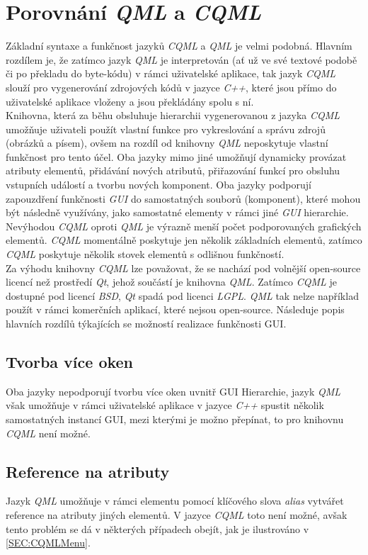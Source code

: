 \documentclass[11pt,twoside,a4paper]{book}
\begin{document}
\section{Porovnání \textit{QML} a \textit{CQML}}
Základní syntaxe a funkčnost jazyků \textit{CQML} a \textit{QML} je velmi podobná. Hlavním rozdílem je, že zatímco jazyk \textit{QML} je interpretován (ať už ve své textové podobě či po překladu do byte-kódu) v rámci uživatelské aplikace, tak jazyk \textit{CQML} slouží pro vygenerování zdrojových kódů v jazyce \textit{C++}, které jsou přímo do uživatelské aplikace vloženy a jsou překládány spolu s ní.\\
Knihovna, která za běhu obsluhuje hierarchii vygenerovanou z jazyka \textit{CQML} umožňuje uživateli použít vlastní funkce pro vykreslování a správu zdrojů (obrázků a písem), ovšem na rozdíl od knihovny \textit{QML} neposkytuje vlastní funkčnost pro tento účel.
Oba jazyky mimo jiné umožňují dynamicky provázat atributy elementů, přidávání nových atributů, přiřazování funkcí pro obsluhu vstupních událostí a tvorbu nových komponent. Oba jazyky podporují zapouzdření funkčnosti \textit{GUI} do samostatných souborů (komponent), které mohou být následně využívány, jako samostatné elementy v rámci jiné \textit{GUI} hierarchie.\\
Nevýhodou \textit{CQML} oproti \textit{QML} je výrazně menší počet podporovaných grafických elementů. \textit{CQML} momentálně poskytuje jen několik základních elementů, zatímco \textit{CQML} poskytuje několik stovek elementů s odlišnou funkčností.\\
Za výhodu knihovny \textit{CQML} lze považovat, že se nachází pod volnější open-source licencí než prostředí \textit{Qt}, jehož součástí je knihovna \textit{QML}. Zatímco \textit{CQML} je dostupné pod licencí \textit{BSD}, \textit{Qt} spadá pod licenci \textit{LGPL}. \textit{QML} tak nelze například použít v rámci komerčních aplikací, které nejsou open-source.
Následuje popis hlavních rozdílů týkajících se možností realizace funkčnosti GUI.
\subsection{Tvorba více oken}
Oba jazyky nepodporují tvorbu více oken uvnitř GUI Hierarchie, jazyk \textit{QML} však umožňuje v rámci uživatelské aplikace v jazyce \textit{C++} spustit několik samostatných instancí GUI, mezi kterými je možno přepínat, to pro knihovnu \textit{CQML} není možné.
\subsection{Reference na atributy}
Jazyk \textit{QML} umožňuje v rámci elementu pomocí klíčového slova \textit{alias} vytvářet reference na atributy jiných elementů. V jazyce \textit{CQML} toto není možné, avšak tento problém se dá v některých případech obejít, jak je ilustrováno v \ref{SEC:CQMLMenu}.
\end{document}
